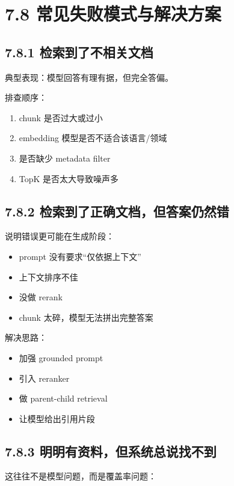 \section{7.8 常见失败模式与解决方案}

\subsection{7.8.1 检索到了不相关文档}

典型表现：模型回答有理有据，但完全答偏。


排查顺序：


\begin{enumerate}[leftmargin=2em]
\item chunk 是否过大或过小
\item embedding 模型是否不适合该语言/领域
\item 是否缺少 metadata filter
\item TopK 是否太大导致噪声多
\end{enumerate}

\subsection{7.8.2 检索到了正确文档，但答案仍然错}

说明错误更可能在生成阶段：


\begin{itemize}[leftmargin=2em]
\item prompt 没有要求``仅依据上下文''
\item 上下文排序不佳
\item 没做 rerank
\item chunk 太碎，模型无法拼出完整答案
\end{itemize}

解决思路：


\begin{itemize}[leftmargin=2em]
\item 加强 grounded prompt
\item 引入 reranker
\item 做 parent-child retrieval
\item 让模型给出引用片段
\end{itemize}

\subsection{7.8.3 明明有资料，但系统总说找不到}

这往往不是模型问题，而是覆盖率问题：


